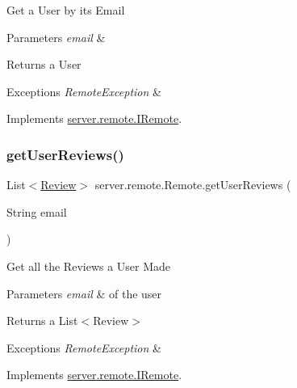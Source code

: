 Get a User by its Email 
\begin{DoxyParams}{Parameters}
{\em email} & \\
\hline
\end{DoxyParams}
\begin{DoxyReturn}{Returns}
a User 
\end{DoxyReturn}

\begin{DoxyExceptions}{Exceptions}
{\em Remote\+Exception} & \\
\hline
\end{DoxyExceptions}


Implements \hyperlink{interfaceserver_1_1remote_1_1_i_remote_ab741cf58a7e2b18ba36069d14d9d04ef}{server.\+remote.\+I\+Remote}.

\mbox{\label{classserver_1_1remote_1_1_remote_a396c96a6b8802c2b4658ecccd37e84db}} 
\subsubsection{\texorpdfstring{get\+User\+Reviews()}{getUserReviews()}}
{\footnotesize\ttfamily List$<$\hyperlink{classserver_1_1data_1_1_review}{Review}$>$ server.\+remote.\+Remote.\+get\+User\+Reviews (\begin{DoxyParamCaption}\item[{String}]{email }\end{DoxyParamCaption})}

Get all the Reviews a User Made 
\begin{DoxyParams}{Parameters}
{\em email} & of the user \\
\hline
\end{DoxyParams}
\begin{DoxyReturn}{Returns}
a List$<$\+Review$>$ 
\end{DoxyReturn}

\begin{DoxyExceptions}{Exceptions}
{\em Remote\+Exception} & \\
\hline
\end{DoxyExceptions}


Implements \hyperlink{interfaceserver_1_1remote_1_1_i_remote_a9e52d282ba2386018ebd6817459a743f}{server.\+remote.\+I\+Remote}.

